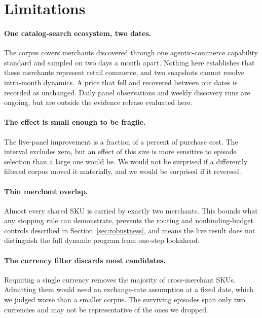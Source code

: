 \section{Limitations}
\label{sec:limitations}

\paragraph{One catalog-search ecosystem, two dates.}
The corpus covers merchants discovered through one agentic-commerce capability
standard and sampled on two days a month apart. Nothing here establishes that these
merchants represent retail commerce, and two snapshots cannot resolve intra-month
dynamics. A price that fell and recovered between our dates is recorded as unchanged.
Daily panel observations and weekly discovery runs are ongoing, but are outside the
evidence release evaluated here.

\paragraph{The effect is small enough to be fragile.}
The live-panel improvement is a fraction of a percent of purchase cost. The interval
excludes zero, but an effect of this size is more sensitive to episode selection than
a large one would be. We would not be surprised if a differently filtered corpus
moved it materially, and we would be surprised if it reversed.

\paragraph{Thin merchant overlap.}
Almost every shared SKU is carried by exactly two merchants. This bounds what any
stopping rule can demonstrate, prevents the routing and nonbinding-budget controls
described in Section~\ref{sec:robustness}, and means the live result does not
distinguish the full dynamic program from one-step lookahead.

\paragraph{The currency filter discards most candidates.}
Requiring a single currency removes the majority of cross-merchant SKUs. Admitting
them would need an exchange-rate assumption at a fixed date, which we judged worse
than a smaller corpus. The surviving episodes span only two currencies and may not be
representative of the ones we dropped.

